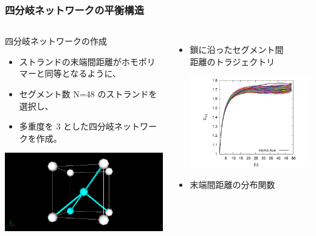 \documentclass[12pt, dvipdfmx]{beamer}
\begin{document}
\begin{frame}
	\frametitle{四分岐ネットワークの平衡構造}
		\begin{columns}[T, onlytextwidth]
				\begin{block}{四分岐ネットワークの作成}
					\begin{itemize}
						\item ストランドの末端間距離がホモポリマーと同等となるように、
						\item セグメント数 N=48 のストランドを選択し、
						\item 多重度を 3 とした四分岐ネットワークを作成。
					\end{itemize}
					\begin{center}
						\includegraphics[width=.6\textwidth]{8_4.png}
					\end{center}
				\end{block}
				\footnotesize
				\begin{itemize}
					\item 鎖に沿ったセグメント間\\距離のトラジェクトリ
					
					\includegraphics[width=.64\textwidth]{N48_f4_CN.png}

					\item 末端間距離の分布関数
					

\end{itemize}
\end{columns}
\end{frame}
\end{document}
